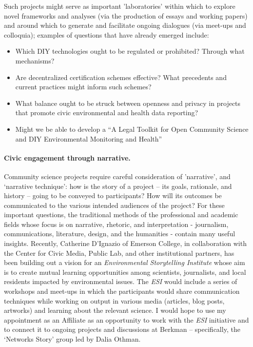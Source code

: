 \documentclass[10pt]{article}
\begin{document}
Such projects might serve as important 'laboratories' within which to explore novel frameworks and analyses (via the production of essays and working papers) and around which to generate and facilitate ongoing dialogues (via meet-ups and colloquia); examples of questions that have already emerged include: 

\begin{itemize}
\item Which DIY technologies ought to be regulated or prohibited? Through what mechanisms?
\item Are decentralized certification schemes effective? What precedents and current practices might inform such schemes?
\item What balance ought to be struck between openness and privacy in projects that promote civic environmental and health data reporting? 
\item Might we be able to develop a ``A Legal Toolkit for Open Community Science and DIY Environmental Monitoring and Health''
\end{itemize}


\paragraph{Civic engagement through narrative.} Community science projects require careful consideration of 'narrative', and `narrative technique':  how is the story of a project -- its goals, rationale, and history -- going to be conveyed to participants? How will its outcomes be communicated to the various intended audiences of the project? For these important questions, the traditional methods of the professional and academic fields whose focus is on narrative, rhetoric, and interpretation - journalism, communications, literature, design, and the humanities - contain many useful insights.  Recently, Catherine D'Ignazio of Emerson College, in collaboration with the Center for Civic Media, Public Lab, and other institutional partners, has been building out a vision for an \emph{Environmental Storytelling Institute} whose aim is to create mutual learning opportunities among scientists, journalists, and local residents impacted by environmental issues.  The \emph{ESI} would include a series of workshops and meet-ups in which the participants would share communication techniques while working on output in various media (articles, blog posts, artworks) and learning about the relevant science.  I would hope to use my appointment as an Affiliate as an opportunity to work with the \emph{ESI} initiative and to connect it to ongoing projects and discussions at Berkman -- specifically, the `Networks Story' group led by Dalia Othman.
\end{document}
